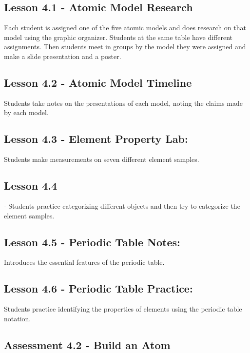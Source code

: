 \documentclass[12pt]{article}
\begin{document}
\subsection{Lesson 4.1 - Atomic Model Research} 

Each student is assigned one of the five atomic models and does research on that model using the graphic organizer. Students at the same table have different assignments. Then students meet in groups by the model they were assigned and make a slide presentation and a poster.

\subsection{Lesson 4.2 - Atomic Model Timeline}

Students take notes on the presentations of each
model, noting the claims made by each model.

\subsection{Lesson 4.3 - Element Property Lab: }

Students make measurements on seven different
element samples.

\subsection{Lesson 4.4} 

- Students practice categorizing different objects and then try to categorize
the element samples.

\subsection{Lesson 4.5 - Periodic Table Notes: }

Introduces the essential features of the periodic
table.

\subsection{Lesson 4.6 - Periodic Table Practice: }

Students practice identifying the properties of
elements using the periodic table notation.

\subsection*{Assessment 4.2 - Build an Atom}
\end{document}
